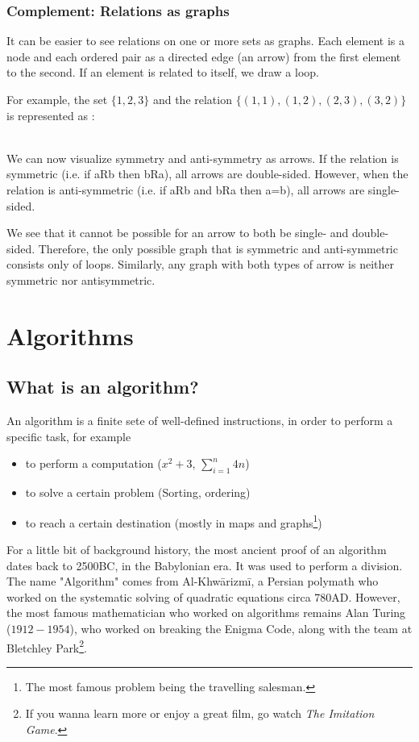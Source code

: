 \documentclass[10pt,a4paper]{book}
\begin{document}
\section{Complement: Relations as graphs}
It can be easier to see relations on one or more sets as graphs. Each element is a node and each ordered pair as a directed edge (an arrow) from the first element to the second. If an element is related to itself, we draw a loop.\par 
For example, the set $\{1,2,3\}$ and the relation $\{(1,1),(1,2),(2,3),(3,2)\}$ is represented as :\par
{} \\
We can now visualize symmetry and anti-symmetry as arrows. If the relation is symmetric (i.e. if aRb then bRa), all arrows are double-sided. However, when the relation is anti-symmetric (i.e. if aRb and bRa then a=b), all arrows are single-sided. \par 
We see that it cannot be possible for an arrow to both be single- and double-sided. Therefore, the only possible graph that is symmetric and anti-symmetric consists only of loops. Similarly, any graph with both types of arrow is neither symmetric nor antisymmetric.

\part{Algorithms}

\chapter{What is an algorithm?}
An algorithm is a finite sete of well-defined instructions, in order to perform a specific task, for example
\begin{itemize}
\item to perform a computation ($x^2 + 3$, $\sum_{i=1}^{n} 4n$)
\item to solve a certain problem (Sorting, ordering)
\item to reach a certain destination (mostly in maps and graphs\footnote{The most famous problem being the travelling salesman.})
\end{itemize}
For a little bit of background history, the most ancient proof of an algorithm dates back to 2500BC, in the Babylonian era. It was used to perform a division. The name "Algorithm" comes from Al-Khwārizmī, a Persian polymath who worked on the systematic solving of quadratic equations circa 780AD. However, the most famous mathematician who worked on algorithms remains Alan Turing ($1912-1954$), who worked on breaking the Enigma Code, along with the team at Bletchley Park\footnote{If you wanna learn more or enjoy a great film, go watch \textit{The Imitation Game}.}.
\end{document}
